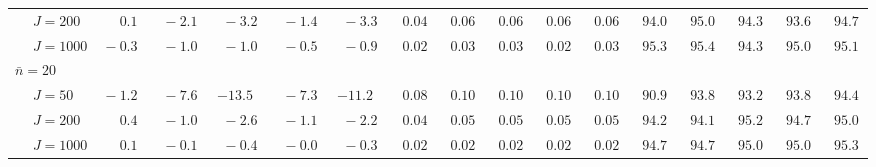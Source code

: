 \begin{sidewaystable}
\begin{threeparttable}
\begin{tabular}{llccccccccccccccc}
 & \nopagebreak $\;J=200$  & $\phantom{0}\phantom{-}0.1\phantom{0}$ & $\phantom{0}{-}2.1\phantom{0}$ & $\phantom{0}{-}3.2\phantom{0}$ & $\phantom{0}{-}1.4\phantom{0}$ & $\phantom{0}{-}3.3\phantom{0}$ & $\phantom{0}0.04\phantom{0}$ & $\phantom{0}0.06\phantom{0}$ & $\phantom{0}0.06\phantom{0}$ & $\phantom{0}0.06\phantom{0}$ & $\phantom{0}0.06\phantom{0}$ & $\phantom{0}94.0\phantom{0}$ & $\phantom{0}95.0\phantom{0}$ & $\phantom{0}94.3\phantom{0}$ & $\phantom{0}93.6\phantom{0}$ & $\phantom{0}94.7\phantom{0}$ \\
 & \nopagebreak $\;J=1000$  & $\phantom{0}{-}0.3\phantom{0}$ & $\phantom{0}{-}1.0\phantom{0}$ & $\phantom{0}{-}1.0\phantom{0}$ & $\phantom{0}{-}0.5\phantom{0}$ & $\phantom{0}{-}0.9\phantom{0}$ & $\phantom{0}0.02\phantom{0}$ & $\phantom{0}0.03\phantom{0}$ & $\phantom{0}0.03\phantom{0}$ & $\phantom{0}0.02\phantom{0}$ & $\phantom{0}0.03\phantom{0}$ & $\phantom{0}95.3\phantom{0}$ & $\phantom{0}95.4\phantom{0}$ & $\phantom{0}94.3\phantom{0}$ & $\phantom{0}95.0\phantom{0}$ & $\phantom{0}95.1\phantom{0}$ \\
\multicolumn{4}{l}{$\bar{n}=20$} \\  & \nopagebreak $\;J=50$  & $\phantom{0}{-}1.2\phantom{0}$ & $\phantom{0}{-}7.6\phantom{0}$ & ${-}13.5\phantom{0}$ & $\phantom{0}{-}7.3\phantom{0}$ & ${-}11.2\phantom{0}$ & $\phantom{0}0.08\phantom{0}$ & $\phantom{0}0.10\phantom{0}$ & $\phantom{0}0.10\phantom{0}$ & $\phantom{0}0.10\phantom{0}$ & $\phantom{0}0.10\phantom{0}$ & $\phantom{0}90.9\phantom{0}$ & $\phantom{0}93.8\phantom{0}$ & $\phantom{0}93.2\phantom{0}$ & $\phantom{0}93.8\phantom{0}$ & $\phantom{0}94.4\phantom{0}$ \\
 & \nopagebreak $\;J=200$  & $\phantom{0}\phantom{-}0.4\phantom{0}$ & $\phantom{0}{-}1.0\phantom{0}$ & $\phantom{0}{-}2.6\phantom{0}$ & $\phantom{0}{-}1.1\phantom{0}$ & $\phantom{0}{-}2.2\phantom{0}$ & $\phantom{0}0.04\phantom{0}$ & $\phantom{0}0.05\phantom{0}$ & $\phantom{0}0.05\phantom{0}$ & $\phantom{0}0.05\phantom{0}$ & $\phantom{0}0.05\phantom{0}$ & $\phantom{0}94.2\phantom{0}$ & $\phantom{0}94.1\phantom{0}$ & $\phantom{0}95.2\phantom{0}$ & $\phantom{0}94.7\phantom{0}$ & $\phantom{0}95.0\phantom{0}$ \\
 & \nopagebreak $\;J=1000$  & $\phantom{0}\phantom{-}0.1\phantom{0}$ & $\phantom{0}{-}0.1\phantom{0}$ & $\phantom{0}{-}0.4\phantom{0}$ & $\phantom{0}{-}0.0\phantom{0}$ & $\phantom{0}{-}0.3\phantom{0}$ & $\phantom{0}0.02\phantom{0}$ & $\phantom{0}0.02\phantom{0}$ & $\phantom{0}0.02\phantom{0}$ & $\phantom{0}0.02\phantom{0}$ & $\phantom{0}0.02\phantom{0}$ & $\phantom{0}94.7\phantom{0}$ & $\phantom{0}94.7\phantom{0}$ & $\phantom{0}95.0\phantom{0}$ & $\phantom{0}95.0\phantom{0}$ & $\phantom{0}95.3\phantom{0}$ \\

\end{tabular}
\end{threeparttable}
\end{sidewaystable}
